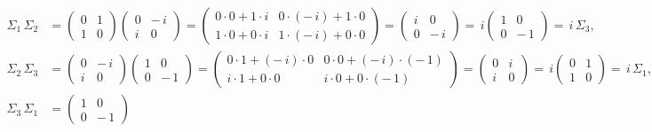 \documentclass{article}
\theoremstyle{plain}
\theoremstyle{definition}
\theoremstyle{remark}
\begin{document}
\begin{enumerate}
        \begin{align*}
            \Sigma_1\,\Sigma_2
            &=
            \begin{pmatrix} 0 & 1 \\[4pt] 1 & 0 \end{pmatrix}
            \begin{pmatrix} 0 & -\,i \\[4pt] i & 0 \end{pmatrix}
            =
            \begin{pmatrix}
            0\cdot 0 + 1\cdot i & 0\cdot(-\,i) + 1\cdot 0 \\[6pt]
            1\cdot 0 + 0\cdot i & 1\cdot(-\,i) + 0\cdot 0
            \end{pmatrix}
            =
            \begin{pmatrix} i & 0 \\[4pt] 0 & -\,i \end{pmatrix}
            =\,i
            \begin{pmatrix} 1 & 0 \\[4pt] 0 & -\,1 \end{pmatrix}
            =\,i\,\Sigma_3, \\[1em]
            \Sigma_2\,\Sigma_3
            &=
            \begin{pmatrix} 0 & -\,i \\[4pt] i & 0 \end{pmatrix}
            \begin{pmatrix} 1 & 0 \\[4pt] 0 & -\,1 \end{pmatrix}
            =
            \begin{pmatrix}
            0\cdot 1 + (-\,i)\cdot 0 & 0\cdot 0 + (-\,i)\cdot(-\,1) \\[6pt]
            i\cdot 1 + 0\cdot 0 & i\cdot 0 + 0\cdot(-\,1)
            \end{pmatrix}
            =
            \begin{pmatrix} 0 & i \\[4pt] i & 0 \end{pmatrix}
            =\,i
            \begin{pmatrix} 0 & 1 \\[4pt] 1 & 0 \end{pmatrix}
            =\,i\,\Sigma_1, \\[1em]
            \Sigma_3\,\Sigma_1
            &=
            \begin{pmatrix} 1 & 0 \\[4pt] 0 & -\,1 \end{pmatrix}

\end{align*}
\end{enumerate}
\end{document}
